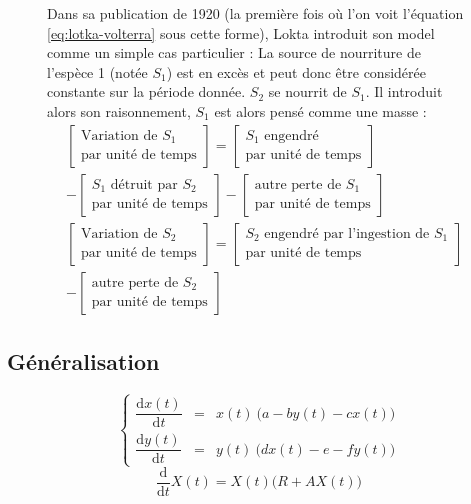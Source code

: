 \documentclass{wsdcr}
\begin{document}
\begin{figure}[b!]
{\begin{minipage}{.95\linewidth}
Dans sa publication de 1920 (la première fois où l'on voit l'équation \ref{eq:lotka-volterra} sous cette forme), Lokta introduit son model comme un simple cas particulier : La source de nourriture de l'espèce 1 (notée $S_1$) est en excès et peut donc être considérée constante sur la période donnée. $S_2$ se nourrit de $S_1$.
Il introduit alors son raisonnement, $S_1$ est alors pensé comme une masse :
\begin{equation}
\begin{aligned}
&\begin{bmatrix}
\text{Variation de }S_1 \\ \text{par unité de temps}
\end{bmatrix}
=
\begin{bmatrix}
S_1\text{ engendré}\\ \text{par unité de temps}
\end{bmatrix} \\
&- 
\begin{bmatrix}
S_1\text{ détruit par }S_2\\ \text{par unité de temps}
\end{bmatrix}
-
\begin{bmatrix}
\text{autre perte de }S_1\\ \text{par unité de temps}
\end{bmatrix} \\
&\begin{bmatrix}
\text{Variation de }S_2 \\ \text{par unité de temps}
\end{bmatrix}
=
\begin{bmatrix}
S_2\text{ engendré par l'ingestion de }S_1\\ \text{par unité de temps}
\end{bmatrix} \\
&-
\begin{bmatrix}
\text{autre perte de }S_2\\ \text{par unité de temps}
\end{bmatrix} 
\end{aligned}
\end{equation}
\end{minipage}
}
\end{figure}
\subsection{Généralisation}
\begin{equation}
\left\{
{\begin{array}{ccc}{\dfrac {\mathrm {d} x(t)}{\mathrm {d} t}}&=&x(t)\ {\Big (}a -b y(t)-c x(t){\Big )}\\{\dfrac {\mathrm {d} y(t)}{\mathrm {d} t}}&=&y(t)\ {\Big (}d x(t)-e -f y(t) {\Big )}\end{array}}
\right.
\end{equation}
\begin{equation}
\dfrac {\mathrm {d}}{\mathrm {d} t}X(t)=X(t) {\Big (}R+AX(t){\Big )}
\end{equation}
\end{document}
